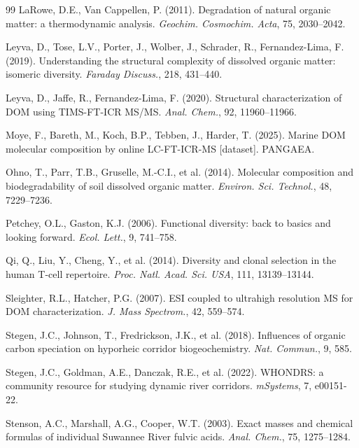 \documentclass[12pt,letterpaper]{article}
\begin{document}
\begin{thebibliography}{99}
LaRowe, D.E., Van Cappellen, P. (2011).
Degradation of natural organic matter: a thermodynamic analysis.
\textit{Geochim. Cosmochim. Acta}, 75, 2030--2042.

Leyva, D., Tose, L.V., Porter, J., Wolber, J., Schrader, R., Fernandez-Lima, F. (2019).
Understanding the structural complexity of dissolved organic matter: isomeric diversity.
\textit{Faraday Discuss.}, 218, 431--440.

Leyva, D., Jaffe, R., Fernandez-Lima, F. (2020).
Structural characterization of DOM using TIMS-FT-ICR MS/MS.
\textit{Anal. Chem.}, 92, 11960--11966.

Moye, F., Bareth, M., Koch, B.P., Tebben, J., Harder, T. (2025).
Marine DOM molecular composition by online LC-FT-ICR-MS [dataset]. PANGAEA.

Ohno, T., Parr, T.B., Gruselle, M.-C.I., et al. (2014).
Molecular composition and biodegradability of soil dissolved organic matter.
\textit{Environ. Sci. Technol.}, 48, 7229--7236.

Petchey, O.L., Gaston, K.J. (2006).
Functional diversity: back to basics and looking forward.
\textit{Ecol. Lett.}, 9, 741--758.

Qi, Q., Liu, Y., Cheng, Y., et al. (2014).
Diversity and clonal selection in the human T-cell repertoire.
\textit{Proc. Natl. Acad. Sci. USA}, 111, 13139--13144.

Sleighter, R.L., Hatcher, P.G. (2007).
ESI coupled to ultrahigh resolution MS for DOM characterization.
\textit{J. Mass Spectrom.}, 42, 559--574.

Stegen, J.C., Johnson, T., Fredrickson, J.K., et al. (2018).
Influences of organic carbon speciation on hyporheic corridor biogeochemistry.
\textit{Nat. Commun.}, 9, 585.

Stegen, J.C., Goldman, A.E., Danczak, R.E., et al. (2022).
WHONDRS: a community resource for studying dynamic river corridors.
\textit{mSystems}, 7, e00151-22.

Stenson, A.C., Marshall, A.G., Cooper, W.T. (2003).
Exact masses and chemical formulas of individual Suwannee River fulvic acids.
\textit{Anal. Chem.}, 75, 1275--1284.


\end{thebibliography}
\end{document}

